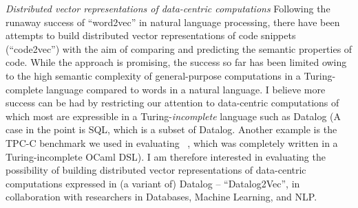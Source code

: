 {\itshape\color{MidnightBlue} Distributed vector representations of
data-centric computations} Following the runaway success of
``word2vec'' in natural language processing, there have been attempts
to build distributed vector representations of code snippets
(``code2vec'') with the aim of comparing and predicting the semantic
properties of code. While the approach is promising, the success so
far has been limited owing to the high semantic complexity of
general-purpose computations in a Turing-complete language compared to
words in a natural language. I believe more success can be had by
restricting our attention to data-centric computations of which most
are expressible in a Turing-\emph{incomplete} language such as Datalog (A
case in the point is SQL, which is a subset of Datalog. Another
example is the TPC-C benchmark we used in evaluating
\acidifier~\cite{popl18}, which was completely written in a
Turing-incomplete OCaml DSL). I am therefore interested in evaluating
the possibility of building distributed vector representations of
data-centric computations expressed in (a variant of) Datalog --
``Datalog2Vec'', in collaboration with researchers in Databases, 
Machine Learning, and NLP.

